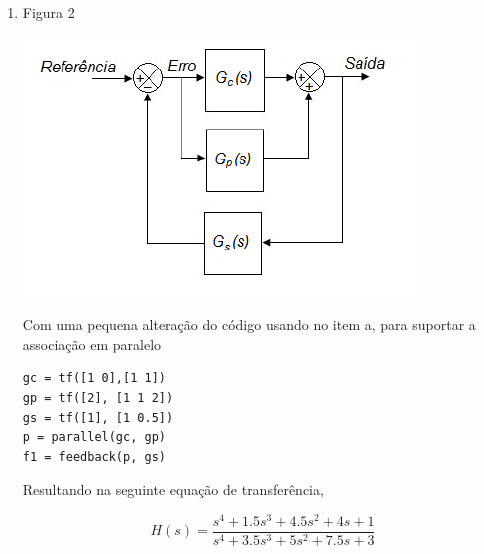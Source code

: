 \documentclass[a4paper, 10pt]{article}
\begin{document}
\begin{list}{\textbf{Questão .}}{
\setlength{\labelwidth}{-2mm} \setlength{\parsep}{0mm}
\setlength{\topsep}{0mm} \setlength{\leftmargin}{0mm}}
\begin{enumerate}
            Usando os comandos $series$ e $feedback$ é possível criar a função
            de transferência, para tanto o código abaixo foi construído,

            \begin{lstlisting}
gc = tf([1 0],[1 1])
gp = tf([2], [1 1 2])
gs = tf([1], [1 0.5])
s = series(gc, gp)
f = feedback(s, gs)
             \end{lstlisting}

            Resultando na seguinte equação de transferência,

            $$
            H(s) = \frac{2 s^2 + s}{s^4 + 2.5 s^3 + 4 s^2 + 5.5 s + 1}
            $$


        \item
             Figura 2
            \begin{center}
            \includegraphics[scale=0.5]{fig5b.png}
            \end{center}
            
            Com uma pequena alteração do código usando no item a, para suportar
            a associação em paralelo

             \begin{lstlisting}
gc = tf([1 0],[1 1])
gp = tf([2], [1 1 2])
gs = tf([1], [1 0.5])
p = parallel(gc, gp)
f1 = feedback(p, gs)
             \end{lstlisting}

             Resultando na seguinte equação de transferência,

             $$
                H(s) = \frac{s^4 + 1.5 s^3 + 4.5 s^2 + 4 s + 1}{s^4 + 3.5 s^3 + 5 s^2 + 7.5 s + 3}
             $$


    \end{enumerate}




\end{list}
\end{document}
